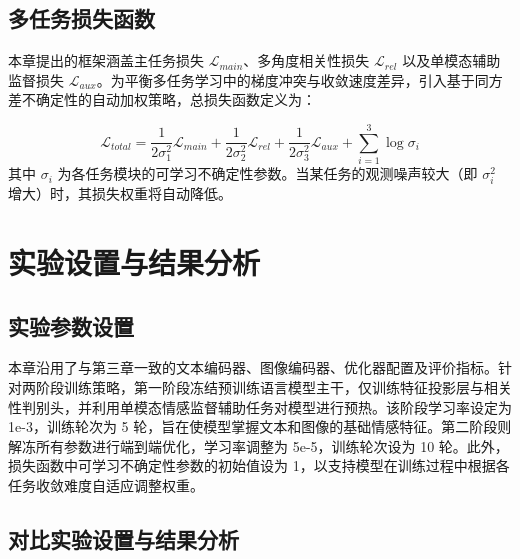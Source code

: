 \subsection{多任务损失函数}
本章提出的框架涵盖主任务损失 $\mathcal{L}_{main}$、多角度相关性损失 $\mathcal{L}_{rel}$ 以及单模态辅助监督损失 $\mathcal{L}_{aux}$。为平衡多任务学习中的梯度冲突与收敛速度差异，引入基于同方差不确定性的自动加权策略\cite{kendall2018multi}，总损失函数定义为：

\begin{equation}
\mathcal{L}_{total} = \frac{1}{2\sigma_1^2} \mathcal{L}_{main} + \frac{1}{2\sigma_2^2} \mathcal{L}_{rel} + \frac{1}{2\sigma_3^2} \mathcal{L}_{aux} + \sum_{i=1}^{3} \log \sigma_i
\end{equation}
其中 $\sigma_i$ 为各任务模块的可学习不确定性参数。当某任务的观测噪声较大（即 $\sigma_i^2$ 增大）时，其损失权重将自动降低。

\section{实验设置与结果分析}
\subsection{实验参数设置}
本章沿用了与第三章一致的文本编码器、图像编码器、优化器配置及评价指标。针对两阶段训练策略，第一阶段冻结预训练语言模型主干，仅训练特征投影层与相关性判别头，并利用单模态情感监督辅助任务对模型进行预热。该阶段学习率设定为 1e-3，训练轮次为 5 轮，旨在使模型掌握文本和图像的基础情感特征。第二阶段则解冻所有参数进行端到端优化，学习率调整为 5e-5，训练轮次设为 10 轮。此外，损失函数中可学习不确定性参数的初始值设为 1，以支持模型在训练过程中根据各任务收敛难度自适应调整权重。

\subsection{对比实验设置与结果分析}

